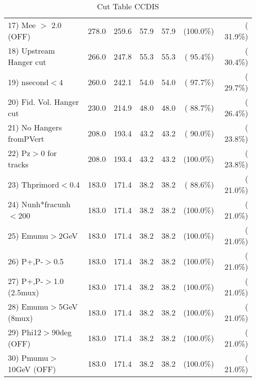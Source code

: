 \begin{table}[h!]
\begin{tabular}{||l||r|r|r|r|r|r||}
 17) Mee $>$ 2.0  (OFF)   &        278.0 &        259.6 &         57.9 &         57.9 & (100.0\%) & ( 31.9\%) \\
 18) Upstream Hanger cut  &        266.0 &        247.8 &         55.3 &         55.3 & ( 95.4\%) & ( 30.4\%) \\
 19) nsecond$<$4          &        260.0 &        242.1 &         54.0 &         54.0 & ( 97.7\%) & ( 29.7\%) \\
 20) Fid. Vol. Hanger cut &        230.0 &        214.9 &         48.0 &         48.0 & ( 88.7\%) & ( 26.4\%) \\
 21) No Hangers fromPVert &        208.0 &        193.4 &         43.2 &         43.2 & ( 90.0\%) & ( 23.8\%) \\
 22) Pz$>$0 for tracks    &        208.0 &        193.4 &         43.2 &         43.2 & (100.0\%) & ( 23.8\%) \\
 23) Thprimord$<$0.4      &        183.0 &        171.4 &         38.2 &         38.2 & ( 88.6\%) & ( 21.0\%) \\
 24) Nunh*fracunh$<$200   &        183.0 &        171.4 &         38.2 &         38.2 & (100.0\%) & ( 21.0\%) \\
 25) Emumu$>$2GeV         &        183.0 &        171.4 &         38.2 &         38.2 & (100.0\%) & ( 21.0\%) \\
 26) P+,P-$>$0.5          &        183.0 &        171.4 &         38.2 &         38.2 & (100.0\%) & ( 21.0\%) \\
 27) P+,P-$>$1.0 (2.5mux) &        183.0 &        171.4 &         38.2 &         38.2 & (100.0\%) & ( 21.0\%) \\
 28) Emumu$>$5GeV  (8mux) &        183.0 &        171.4 &         38.2 &         38.2 & (100.0\%) & ( 21.0\%) \\
 29) Phi12$>$90deg  (OFF) &        183.0 &        171.4 &         38.2 &         38.2 & (100.0\%) & ( 21.0\%) \\
 30) Pmumu$>$10GeV  (OFF) &        183.0 &        171.4 &         38.2 &         38.2 & (100.0\%) & ( 21.0\%) \\
 \hline
 \hline
 \end{tabular}
 \caption{Cut Table  CCDIS    }
 \label{tab-cutcohjpsi-mumu_ncdis}
 \end{table}
